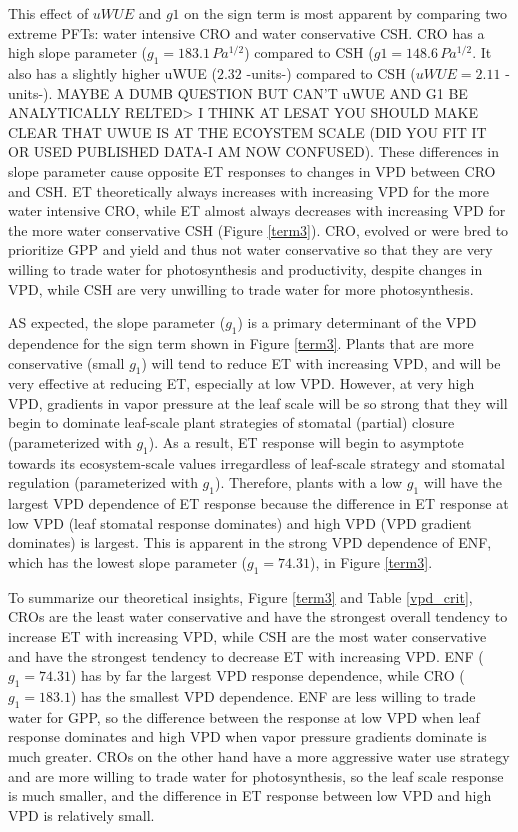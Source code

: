 \documentclass[draft,linenumbers]{agujournal}
\begin{document}
This effect of $uWUE$ and $g1$ on the sign term is most apparent by comparing two extreme PFTs: water intensive CRO and water conservative CSH. CRO has a high slope parameter ($g_1 = 183.1 \, Pa^{1/2}$) compared to CSH ($g1 = 148.6 \, Pa^{1/2}$. It also has a slightly higher uWUE ($2.32$ -units-) compared to CSH ($uWUE=2.11$ -units-). MAYBE A DUMB QUESTION BUT CAN'T uWUE AND G1 BE ANALYTICALLY RELTED> I THINK AT LESAT YOU SHOULD MAKE CLEAR THAT UWUE IS AT THE ECOYSTEM SCALE (DID YOU FIT IT OR USED PUBLISHED DATA-I AM NOW CONFUSED). These differences in slope parameter cause opposite ET responses to changes in VPD between CRO and CSH. ET theoretically always increases with increasing VPD for the more water intensive CRO, while ET almost always decreases with increasing VPD for the more water conservative CSH (Figure \ref{term3}). CRO, evolved or were bred to prioritize GPP and yield and thus not water conservative so that they are very willing to trade water for photosynthesis and productivity, despite changes in VPD, while CSH are very unwilling to trade water for more photosynthesis.

AS expected, the slope parameter ($g_1$) is a primary determinant of the VPD dependence for the sign term shown in Figure \ref{term3}. Plants that are more conservative (small $g_1$) will tend to reduce ET with increasing VPD, and will be very effective at reducing ET, especially at low VPD. However, at very high VPD, gradients in vapor pressure at the leaf scale will be so strong that they will begin to dominate leaf-scale plant strategies of stomatal (partial) closure (parameterized with $g_1$). As a result, ET response will begin to asymptote towards its ecosystem-scale values irregardless of leaf-scale strategy and stomatal regulation (parameterized with $g_1$). Therefore, plants with a low $g_1$ will have the largest VPD dependence of ET response because the difference in ET response at low VPD (leaf stomatal response dominates) and high VPD (VPD gradient dominates) is largest. This is apparent in the strong VPD dependence of ENF, which has the lowest slope parameter ($g_1=74.31$), in Figure \ref{term3}.  

To summarize our theoretical insights, Figure \ref{term3} and Table \ref{vpd_crit}, CROs are the least water conservative and have the strongest overall tendency to increase ET with increasing VPD, while CSH are the most water conservative and have the strongest tendency to decrease ET with increasing VPD.  ENF ($g_1 = 74.31$) has by far the largest VPD response dependence, while CRO ($g_1 = 183.1$) has the smallest VPD dependence. ENF are less willing to trade water for GPP, so the difference between the response at low VPD when leaf response dominates and high VPD when vapor pressure gradients dominate is much greater. CROs on the other hand have a more aggressive water use strategy and are more willing to trade water for photosynthesis, so the leaf scale response is much smaller, and the difference in ET response between low VPD and high VPD is relatively small.
\end{document}
